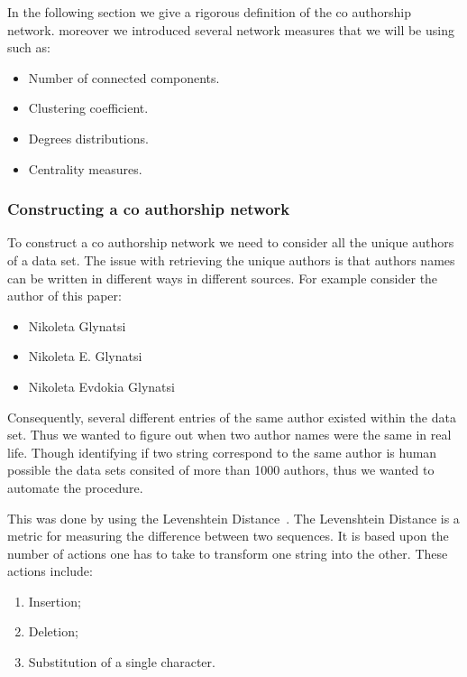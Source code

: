 \documentclass{article}
\theoremstyle{definition}
\begin{document}
In the following section we give a rigorous definition of the co authorship
network. moreover we introduced several network measures that we will be using
such as:

\begin{itemize}
    \item Number of connected components.
    \item Clustering coefficient.
    \item Degrees distributions.
    \item Centrality measures.
\end{itemize}

\subsubsection{Constructing a co authorship network}

To construct a co authorship network we need to consider all the unique authors of a data set.
The issue with retrieving the unique authors is that authors names can be written
in different ways in different sources. For example consider the author of this
paper:

\begin{itemize}
    \item Nikoleta Glynatsi
    \item Nikoleta E. Glynatsi
    \item Nikoleta Evdokia Glynatsi
\end{itemize}

Consequently, several different entries of the same author existed within the data
set. Thus we wanted to figure out when two author names were the same in real life.
Though identifying if two string correspond to the same author is human possible
the data sets consited of more than 1000 authors, thus we wanted to automate the
procedure.

This was done by using the Levenshtein Distance~\cite{miller2009}. The Levenshtein
Distance is a metric for measuring the difference between two sequences. It is
based upon the number of actions one has to take to transform one string into
the other. These actions include:

\begin{enumerate}
    \item Insertion;
    \item Deletion;
    \item Substitution of a single character.
\end{enumerate}
\end{document}
